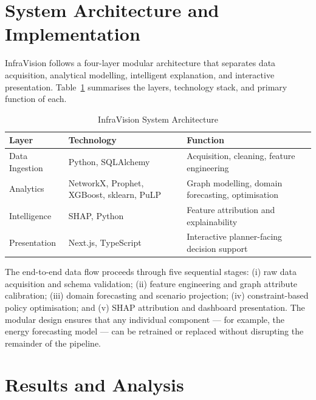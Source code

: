 \documentclass[conference]{IEEEtran}
\begin{document}
\section{System Architecture and Implementation}
\label{sec:arch}

InfraVision follows a four-layer modular architecture that separates
data acquisition, analytical modelling, intelligent explanation, and
interactive presentation. Table~\ref{tab:arch} summarises the layers,
technology stack, and primary function of each.

\begin{table}[htbp]
\caption{InfraVision System Architecture}
\label{tab:arch}
\begin{center}
\begin{tabular}{|p{1.3cm}|p{2.4cm}|p{3.8cm}|}
\hline
\textbf{Layer} & \textbf{Technology} & \textbf{Function} \\
\hline
Data Ingestion & Python, SQLAlchemy & Acquisition, cleaning, feature engineering \\
\hline
Analytics & NetworkX, Prophet, XGBoost, sklearn, PuLP & Graph modelling, domain forecasting, optimisation \\
\hline
Intelligence & SHAP, Python & Feature attribution and explainability \\
\hline
Presentation & Next.js, TypeScript & Interactive planner-facing decision support \\
\hline
\end{tabular}
\end{center}
\end{table}

The end-to-end data flow proceeds through five sequential stages: (i)
raw data acquisition and schema validation; (ii) feature engineering and
graph attribute calibration; (iii) domain forecasting and scenario
projection; (iv) constraint-based policy optimisation; and (v) SHAP
attribution and dashboard presentation. The modular design ensures that
any individual component --- for example, the energy forecasting model
--- can be retrained or replaced without disrupting the remainder of the
pipeline.

\section{Results and Analysis}
\label{sec:results}
\end{document}
